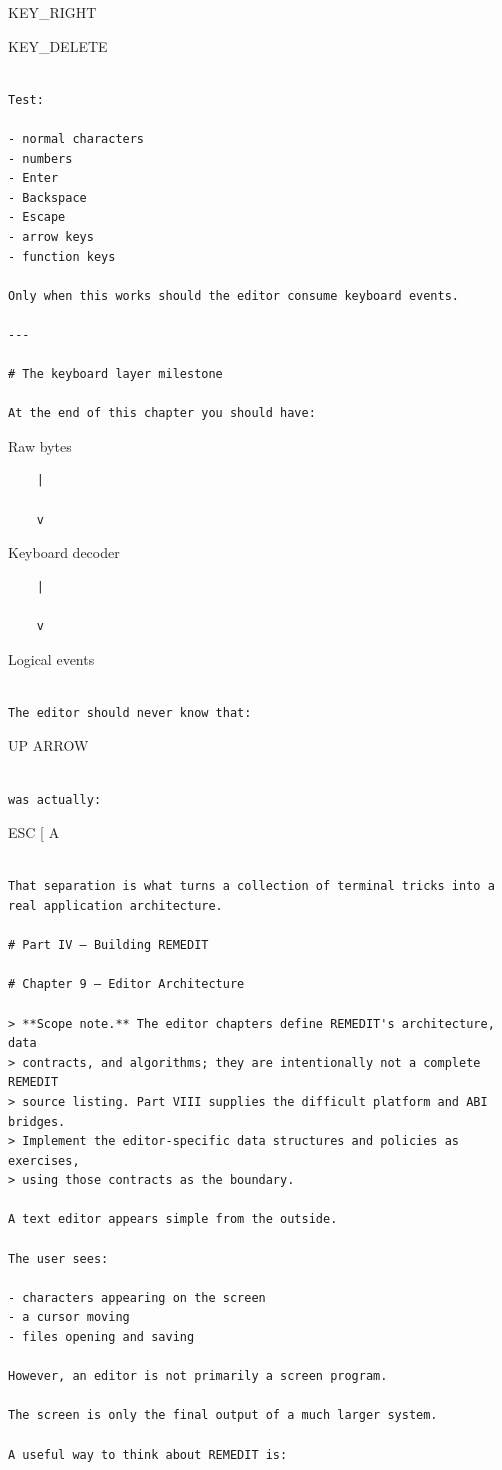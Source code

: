 \documentclass[
  oneside,
  openany]{book}
\begin{document}
KEY\_RIGHT

KEY\_DELETE

\begin{verbatim}

Test:

- normal characters
- numbers
- Enter
- Backspace
- Escape
- arrow keys
- function keys

Only when this works should the editor consume keyboard events.

---

# The keyboard layer milestone

At the end of this chapter you should have:
\end{verbatim}

Raw bytes

\begin{verbatim}
    |

    v
\end{verbatim}

Keyboard decoder

\begin{verbatim}
    |

    v
\end{verbatim}

Logical events

\begin{verbatim}

The editor should never know that:
\end{verbatim}

UP ARROW

\begin{verbatim}

was actually:
\end{verbatim}

ESC {[} A

\begin{verbatim}

That separation is what turns a collection of terminal tricks into a real application architecture.

# Part IV — Building REMEDIT

# Chapter 9 — Editor Architecture

> **Scope note.** The editor chapters define REMEDIT's architecture, data
> contracts, and algorithms; they are intentionally not a complete REMEDIT
> source listing. Part VIII supplies the difficult platform and ABI bridges.
> Implement the editor-specific data structures and policies as exercises,
> using those contracts as the boundary.

A text editor appears simple from the outside.

The user sees:

- characters appearing on the screen
- a cursor moving
- files opening and saving

However, an editor is not primarily a screen program.

The screen is only the final output of a much larger system.

A useful way to think about REMEDIT is:
\end{verbatim}
\end{document}
